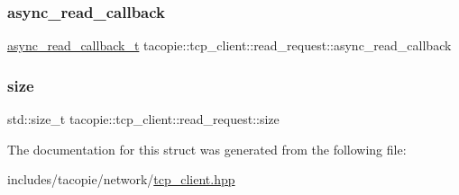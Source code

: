\subsubsection{\texorpdfstring{async\+\_\+read\+\_\+callback}{async\_read\_callback}}
{\footnotesize\ttfamily \hyperlink{classtacopie_1_1tcp__client_acdf9dea8bac6c56f7b04ce38b9432322}{async\+\_\+read\+\_\+callback\+\_\+t} tacopie\+::tcp\+\_\+client\+::read\+\_\+request\+::async\+\_\+read\+\_\+callback}

\mbox{\label{structtacopie_1_1tcp__client_1_1read__request_ad8b69f61884c60596aface363ca947a3}} 
\subsubsection{\texorpdfstring{size}{size}}
{\footnotesize\ttfamily std\+::size\+\_\+t tacopie\+::tcp\+\_\+client\+::read\+\_\+request\+::size}



The documentation for this struct was generated from the following file\+:\begin{DoxyCompactItemize}
\item 
includes/tacopie/network/\hyperlink{tcp__client_8hpp}{tcp\+\_\+client.\+hpp}\end{DoxyCompactItemize}
